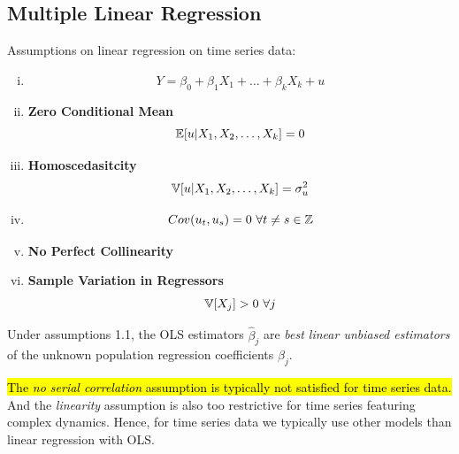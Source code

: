 \documentclass[11pt]{article}
\begin{document}
		\subsection{Multiple Linear Regression}
		\begin{assumption} Assumptions on linear regression on time series data:
			\begin{enumerate}[(i)]
				\item {}
					\begin{equation}
						Y = \beta_0 + \beta_1 X_1 + \dots + \beta_k X_k + u
					\end{equation}
				\item \textbf{Zero Conditional Mean}
					\begin{equation}
						\mathbb{E}[{u|X_1, X_2, \dots, X_k}] = 0
					\end{equation}
				\item \textbf{Homoscedasitcity}
					\begin{equation}
						\mathbb{V}[{u|X_1, X_2, \dots, X_k}] = \sigma^2_u
					\end{equation}
				\item {}
					\begin{equation}
						Cov(u_t, u_s) = 0\ \forall t \neq s \in \mathbb{Z}
					\end{equation}
				\item \textbf{No Perfect Collinearity}
				\item \textbf{Sample Variation in Regressors}
					\begin{equation}
						\mathbb{V}[{X_j}] > 0\ \forall j
					\end{equation}
			\end{enumerate}
		\end{assumption}
		
		\begin{theorem}
			Under assumptions 1.1, the OLS estimators $\hat{\beta}_j$ are \emph{best linear unbiased estimators} of the unknown population regression coefficients $\beta_j$.
		\end{theorem}
		
		\begin{remark}
			\hl{The \emph{no serial correlation} assumption is typically not satisfied for time series data.} And the \emph{linearity} assumption is also too restrictive for time series featuring complex dynamics. Hence, for time series data we typically use other models than linear regression with OLS.
		\end{remark}
		
\end{document}
